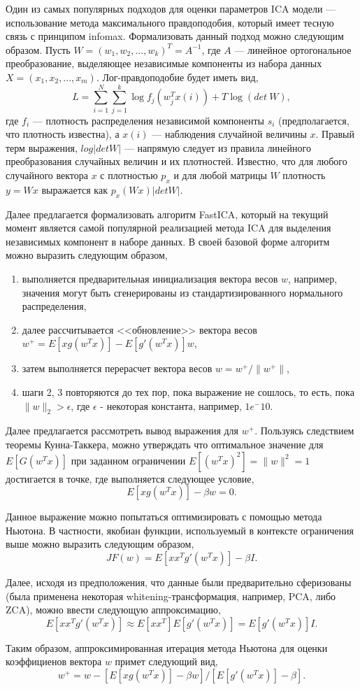 \documentclass[runningheads]{llncs}
\begin{document}
Один из самых популярных подходов для оценки параметров ICA модели — использование метода максимального правдоподобия, который имеет тесную связь с принципом infomax. Формализовать данный подход можно следующим образом. Пусть $W = (w_1, w_2, ..., w_k)^T = A^{-1}$, где $A$ — линейное ортогональное преобразование, выделяющее независимые компоненты из набора данных $X = (x_1, x_2, ..., x_m)$. Лог-правдоподобие будет иметь вид, $$L = \sum_{i=1}^{N}\sum_{j=1}^{k}\log{f_j(w_j^{T}x(i))} + T\log(det\ W),$$
где $f_i$ — плотность распределения независимой компоненты $s_i$ (предполагается, что плотность известна), а $x(i)$ — наблюдения случайной величины $x$. Правый терм выражения, $log |det W|$ — напрямую следует из правила линейного преобразования случайных величин и их плотностей. Известно, что для любого случайного вектора $x$ с плотностью $p_x$ и для любой матрицы $W$ плотность $y = Wx$ выражается как $p_x(Wx)|det W|$. \par
Далее предлагается формализовать алгоритм FastICA, который на текущий момент является самой популярной реализацией метода ICA для выделения независимых компонент в наборе данных. В своей базовой форме алгоритм можно выразить следующим образом,

\begin{enumerate}
  \item выполняется предварительная инициализация вектора весов $w$, например, значения могут быть сгенерированы из стандартизированного нормального распределения,
  \item далее рассчитывается <<обновление>> вектора весов $w^+ = E[xg(w^Tx)] - E[g'(w^Tx)]w$,
  \item затем выполняется перерасчет вектора весов $w = w^+/\|w^+\|$,
  \item шаги 2, 3 повторяются до тех пор, пока выражение не сошлось, то есть, пока $\|w\|_2 > \epsilon$, где $\epsilon$ - некоторая константа, например, $1e^-10$.
\end{enumerate}

Далее предлагается рассмотреть вывод выражения для $w^+$. Пользуясь следствием теоремы Кунна-Таккера, можно утверждать что оптимальное значение для $E[G(w^Tx)]$ при заданном ограничении $E[(w^Tx)^2] = \|w\|^2 = 1$ достигается в точке, где выполняется следующее условие,
$$E[xg(w^Tx)] - \beta w = 0.$$ \par
Данное выражение можно попытаться оптимизировать с помощью метода Ньютона. В частности, якобиан функции, используемый в контексте ограничения выше можно выразить следующим образом,
$$JF(w) = E[xx^Tg'(w^Tx)] - \beta I.$$ \par
Далее, исходя из предположения, что данные были предварительно сферизованы (была применена некоторая whitening-трансформация, например, PCA, либо ZCA), можно ввести следующую аппроксимацию, $$E[xx^Tg'(w^Tx)] \approx E[xx^T]E[g'(w^Tx)] = E[g'(w^Tx)]I.$$ \par
Таким образом, аппроксимированная итерация метода Ньютона для оценки коэффициенов вектора $w$ примет следующий вид, 
$$w^+ = w - [E[xg(w^Tx)] - \beta w] / [E[g'(w^Tx)] - \beta].$$
\end{document}
